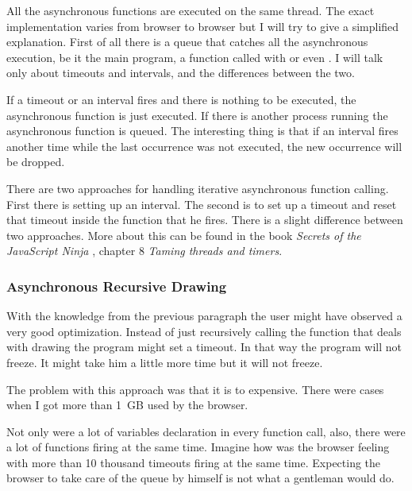             All the asynchronous functions are executed on the same thread.
            The exact implementation varies from browser to browser but I will try to give a simplified explanation.
            First of all there is a queue that catches all the asynchronous execution, be it the main program, a function called with  or even .
            I will talk only about timeouts and intervals, and the differences between the two.

            If a timeout or an interval fires and there is nothing to be executed, the asynchronous function is just executed.
            If there is another process running the asynchronous function is queued.
            The interesting thing is that if an interval fires another time while the last occurrence was not executed, the new occurrence will be dropped.

            There are two approaches for handling iterative asynchronous function calling. 
            First there is setting up an interval.
            The second is to set up a timeout and reset that timeout inside the function that he fires.
            There is a slight difference between two approaches.
            More about this can be found in the book \emph{Secrets of the JavaScript Ninja} \cite{js_ninja}, chapter 8 \emph{Taming threads and timers}.


        \subsubsection{Asynchronous Recursive Drawing}

            With the knowledge from the previous paragraph the user might have observed a very good optimization.
            Instead of just recursively calling the function that deals with drawing the program might set a timeout.
            In that way the program will not freeze.
            It might take him a little more time but it will not freeze.

            The problem with this approach was that it is to expensive.
            There were cases when I got more than 1~GB used by the browser.

            Not only were a lot of variables declaration in every function call, also, there were a lot of functions firing at the same time.
            Imagine how was the browser feeling with more than 10 thousand timeouts firing at the same time.
            Expecting the browser to take care of the queue by himself is not what a gentleman would do.

